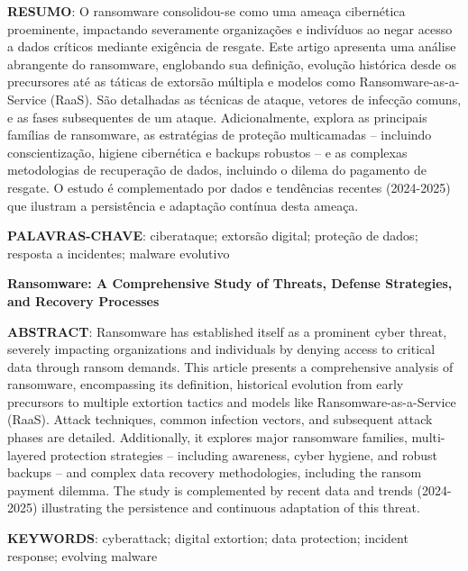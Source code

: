 \vspace{0.5cm}
\noindent\textbf{RESUMO}: O ransomware consolidou-se como uma ameaça cibernética proeminente, 
impactando severamente organizações e indivíduos ao negar acesso a dados críticos mediante exigência de 
resgate. Este artigo apresenta uma análise abrangente do ransomware, englobando sua definição, evolução histórica desde os 
precursores até as táticas de extorsão múltipla e modelos como Ransomware-as-a-Service (RaaS). 
São detalhadas as técnicas de ataque, vetores de infecção comuns, e as fases subsequentes de um ataque. 
Adicionalmente, explora as principais famílias de ransomware, as estratégias de proteção multicamadas – incluindo conscientização, 
higiene cibernética e backups robustos – e as complexas metodologias de recuperação de dados, incluindo o 
dilema do pagamento de resgate. O estudo é complementado por dados e tendências recentes (2024-2025) que ilustram a 
persistência e adaptação contínua desta ameaça.

\vspace{0.5cm}
\noindent\textbf{PALAVRAS-CHAVE}: ciberataque; extorsão digital; proteção de dados; resposta a incidentes; malware evolutivo


\vspace{0.5cm}
\begin{center}
\textbf{Ransomware: A Comprehensive Study of Threats, Defense Strategies, and Recovery Processes}
\end{center}

\noindent\textbf{ABSTRACT}: Ransomware has established itself as a prominent cyber threat, 
severely impacting organizations and individuals by denying access to critical data through ransom demands. 
This article presents a comprehensive analysis of ransomware, encompassing its definition, historical evolution 
from early precursors to multiple extortion tactics and models like Ransomware-as-a-Service (RaaS). Attack techniques, 
common infection vectors, and subsequent attack phases are detailed. Additionally, it explores major ransomware families, 
multi-layered protection strategies – including awareness, cyber hygiene, and robust backups – and complex data recovery 
methodologies, including the ransom payment dilemma. The study is complemented by recent data and trends (2024-2025) 
illustrating the persistence and continuous adaptation of this threat.

\vspace{0.5cm}
\noindent\textbf{KEYWORDS}: cyberattack; digital extortion; data protection; incident response; evolving malware